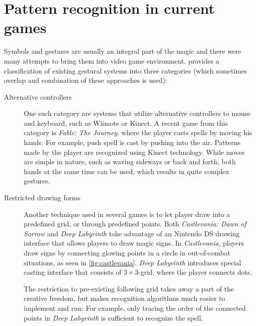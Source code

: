 \section{Pattern recognition in current games}

Symbols and gestures are usually an integral part of the magic and there were many attempts to bring them into video game environment. \citet{gameMagic} provides a classification of existing gestural systems into three categories (which sometimes overlap and combination of these approaches is used):

\begin{description}
\item[Alternative controllers]
One such category are systems that utilize alternative controllers to mouse and keyboard, such as Wiimote or Kinect. A recent game from this category is \emph{Fable: The Journey}, where the player casts spells by moving his hands: For example, push spell is cast by pushing into the air. Patterns made by the player are recognized using Kinect technology. While moves are simple in nature, such as waving sideways or back and forth, both hands at the same time can be used, which results in quite complex gestures.

\item[Restricted drawing forms]
Another technique used in several games is to let player draw into a predefined grid, or through predefined points. Both \emph{Castlevania: Dawn of Sorrow} and \emph{Deep Labyrinth} take advantage of an Nintendo DS drawing interface that allows players to draw magic signs. 
In \emph{Castlevania}, players draw signs by connecting glowing points in a circle in out-of-combat situations, as seen in \cref{fig:castlevania}. \emph{Deep Labyrinth} introduces special casting interface that consists of $3\times 3$-grid, where the player connects dots.

The restriction to pre-existing following grid takes away a part of the creative freedom, but makes recognition algorithms much easier to implement and run: For example, only tracing the order of the connected points in \emph{Deep Labyrinth} is sufficient to recognize the spell.


\end{description}
